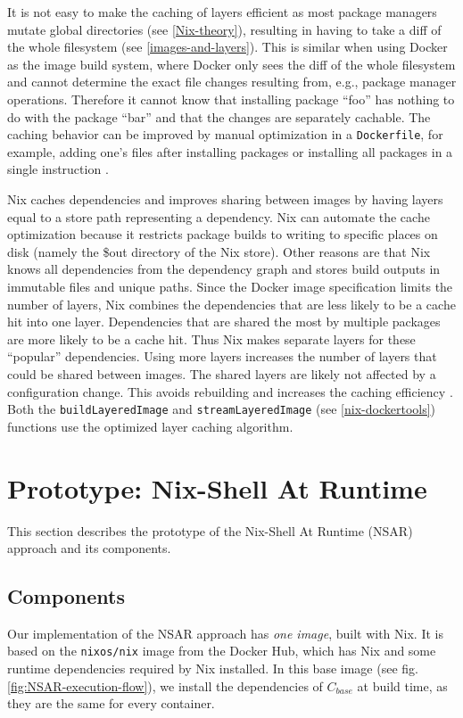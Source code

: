 It is not easy to make the caching of layers efficient as most package managers mutate global directories (see \ref{Nix-theory}), resulting in having to take a diff of the whole filesystem (see \ref{images-and-layers}). This is similar when using Docker as the image build system, where Docker only sees the diff of the whole filesystem and cannot determine the exact file changes resulting from, e.g., package manager operations. Therefore it cannot know that installing package ``foo'' has nothing to do with the package ``bar'' and that the changes are separately cachable. The caching behavior can be improved by manual optimization in a \verb|Dockerfile|, for example, adding one's files after installing packages or installing all packages in a single instruction \cite{Christensen2018}.

Nix caches dependencies and improves sharing between images by having layers equal to a store path representing a dependency. Nix can automate the cache optimization because it restricts package builds to writing to specific places on disk (namely the \$out directory of the Nix store). Other reasons are that Nix knows all dependencies from the dependency graph and stores build outputs in immutable files and unique paths. Since the Docker image specification limits the number of layers, Nix combines the dependencies that are less likely to be a cache hit into one layer. Dependencies that are shared the most by multiple packages are more likely to be a cache hit. Thus Nix makes separate layers for these ``popular'' dependencies. Using more layers increases the number of layers that could be shared between images. The shared layers are likely not affected by a configuration change. This avoids rebuilding and increases the caching efficiency \cite{Christensen2018}. Both the \verb|buildLayeredImage| and \verb|streamLayeredImage| (see \ref{nix-dockertools}) functions use the optimized layer caching algorithm. 
\section{Prototype: Nix-Shell At Runtime}
This section describes the prototype of the Nix-Shell At Runtime (NSAR) approach and its components.
\subsection{Components}
Our implementation of the NSAR approach has \emph{one image}, built with Nix. It is based on the \verb|nixos/nix| image from the Docker Hub, which has Nix and some runtime dependencies required by Nix installed. In this base image (see fig. \ref{fig:NSAR-execution-flow}), we install the dependencies of $C_{base}$ at build time, as they are the same for every container. 


